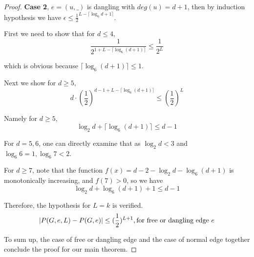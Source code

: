 \begin{proof}
		{\bf Case 2}, $e=(u,\_)$ is dangling with $deg(u)=d+1$, then by induction hypothesis we have 
		$\epsilon \leq \frac{1}{2}^{L-\lceil \log_6{d+1}\rceil}$.

		First we need to show that for $d \leq 4$,
		\[\frac{1}{2^{1+L-\lceil \log_6{(d+1)}\rceil}} \leq \frac{1}{2^L}\]

		which is obvious because $\lceil\log_6{(d+1)}\rceil \leq 1$.

		Next we show for $d \geq 5$,
		\[ d\cdot \left( \frac{1}{2} \right)^{d-1 + L - \lceil \log_6{(d+1)}\rceil}  \leq \left( \frac{1}{2} \right)^L \]

		Namely for $d \geq 5$,
		\[ \log_2 d + \lceil \log_6{(d+1)} \rceil \leq d-1\]

		For $d=5,6$, one can directly examine that as $\log_2 d < 3$ and $\log_6 6 =1, \log_6 7 < 2$.


		For $d\geq 7$, note that the function $f(x) = d-2 -\log_2 d - \log_6{(d+1)}$ is monotonically increasing, and $f(7)>0$, so we have 
        \[ \log_2 d + \log_6{(d+1)} + 1 \leq d-1\]

%
%
%
%

		Therefore, the hypothesis for $L=k$ is verified.
		\[\left\vert P(G,e,L) - P(G,e)\right\vert \leq (\frac{1}{2})^{L+1}, \textrm{for free or dangling edge $e$}\]

		
		To sum up, the case of free or dangling edge and the case of normal edge together conclude the proof for our main theorem.
	\end{proof}
